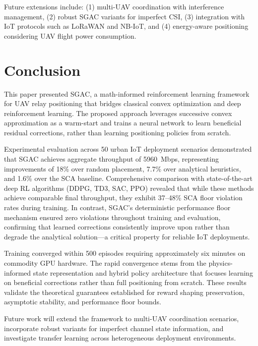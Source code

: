\documentclass[journal]{IEEEtran}
\begin{document}
Future extensions include: (1) multi-UAV coordination with interference management, (2) robust SGAC variants for imperfect CSI, (3) integration with IoT protocols such as LoRaWAN and NB-IoT, and (4) energy-aware positioning considering UAV flight power consumption.

\section{Conclusion}

This paper presented SGAC, a math-informed reinforcement learning framework for UAV relay positioning that bridges classical convex optimization and deep reinforcement learning. The proposed approach leverages successive convex approximation as a warm-start and trains a neural network to learn beneficial residual corrections, rather than learning positioning policies from scratch.

Experimental evaluation across 50 urban IoT deployment scenarios demonstrated that SGAC achieves aggregate throughput of 5960~Mbps, representing improvements of 18\% over random placement, 7.7\% over analytical heuristics, and 1.6\% over the SCA baseline. Comprehensive comparison with state-of-the-art deep RL algorithms (DDPG, TD3, SAC, PPO) revealed that while these methods achieve comparable final throughput, they exhibit 37--48\% SCA floor violation rates during training. In contrast, SGAC's deterministic performance floor mechanism ensured zero violations throughout training and evaluation, confirming that learned corrections consistently improve upon rather than degrade the analytical solution---a critical property for reliable IoT deployments.

Training converged within 500 episodes requiring approximately six minutes on commodity GPU hardware. The rapid convergence stems from the physics-informed state representation and hybrid policy architecture that focuses learning on beneficial corrections rather than full positioning from scratch. These results validate the theoretical guarantees established for reward shaping preservation, asymptotic stability, and performance floor bounds.

Future work will extend the framework to multi-UAV coordination scenarios, incorporate robust variants for imperfect channel state information, and investigate transfer learning across heterogeneous deployment environments.
\end{document}
